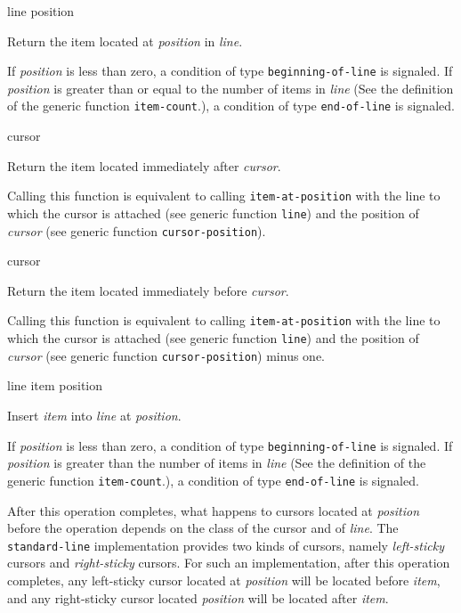  {line position}

Return the item located at \textit{position} in \textit{line}.

If \textit{position} is less than zero, a condition of type
\texttt{beginning-of-line} is signaled.  If \textit{position} is
greater than or equal to the number of items in \textit{line} (See the
definition of the generic function \texttt{item-count}.), a condition
of type \texttt{end-of-line} is signaled.

 {cursor}

Return the item located immediately after \textit{cursor}.

\ifdetached{}

Calling this function is equivalent to calling
\texttt{item-at-position} with the line to which the cursor is
attached (see generic function \texttt{line}) and the position of
\textit{cursor} (see generic function \texttt{cursor-position}).
\howeverperformance{}

 {cursor}

Return the item located immediately before \textit{cursor}.

\ifdetached{}

Calling this function is equivalent to calling
\texttt{item-at-position} with the line to which the cursor is
attached (see generic function \texttt{line}) and the position of
\textit{cursor} (see generic function \texttt{cursor-position}) minus
one.  \howeverperformance{}

 {line item position}

Insert \textit{item} into \textit{line} at \textit{position}.

If \textit{position} is less than zero, a condition of type
\texttt{beginning-of-line} is signaled.  If \textit{position} is
greater than the number of items in \textit{line} (See the definition
of the generic function \texttt{item-count}.), a condition of type
\texttt{end-of-line} is signaled.

After this operation completes, what happens to cursors located at
\textit{position} before the operation depends on the class of the
cursor and of \textit{line}.  The \texttt{standard-line}
implementation provides two kinds of cursors, namely
\emph{left-sticky} cursors and \emph{right-sticky} cursors.  For such
an implementation, after this operation completes, any left-sticky
cursor located at \textit{position} will be located before
\textit{item}, and any right-sticky cursor located \textit{position}
will be located after \textit{item}.

